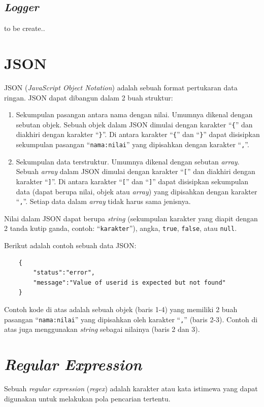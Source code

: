 \subsection{\textit{Logger}}
\label{sec:logger}
to be create..

\section{JSON}
\label{sec:json}
JSON (\textit{JavaScript Object Notation}) adalah sebuah format pertukaran data ringan\cite{json}. JSON dapat dibangun dalam 2 buah struktur:
\begin{enumerate}
	\item Sekumpulan pasangan antara nama dengan nilai. Umumnya dikenal dengan sebutan objek. Sebuah objek dalam JSON dimulai dengan karakter ``\texttt{\{}'' dan diakhiri dengan karakter ``\texttt{\}}''. Di antara karakter ``\texttt{\{}'' dan ``\texttt{\}}'' dapat disisipkan sekumpulan pasangan ``\texttt{nama:nilai}'' yang dipisahkan dengan karakter ``\texttt{,}''.
	\item Sekumpulan data terstruktur. Umumnya dikenal dengan sebutan \textit{array}. Sebuah \textit{array} dalam JSON dimulai dengan karakter ``\texttt{[}'' dan diakhiri dengan karakter ``\texttt{]}''. Di antara karakter ``\texttt{[}'' dan ``\texttt{]}'' dapat disisipkan sekumpulan data (dapat berupa nilai, objek atau \textit{array}) yang dipisahkan dengan karakter ``\texttt{,}''. Setiap data dalam \textit{array} tidak harus sama jenisnya.
\end{enumerate}

Nilai dalam JSON dapat berupa \textit{string} (sekumpulan karakter yang diapit dengan 2 tanda kutip ganda, contoh: ``\texttt{karakter}''), angka, \texttt{true}, \texttt{false}, atau \texttt{null}.

Berikut adalah contoh sebuah data JSON:
\begin{lstlisting}
	{
		"status":"error",
		"message":"Value of userid is expected but not found"
	}
\end{lstlisting}

Contoh kode di atas adalah sebuah objek (baris 1-4) yang memiliki 2 buah pasangan ``\texttt{nama:nilai}'' yang dipisahkan oleh karakter ``\texttt{,}'' (baris 2-3). Contoh di atas juga menggunakan \textit{string} sebagai nilainya (baris 2 dan 3).

\section{\textit{Regular Expression}}
\label{sec:regex}
Sebuah \textit{regular expression} (\textit{regex}) adalah karakter atau kata istimewa yang dapat digunakan untuk melakukan pola pencarian tertentu.